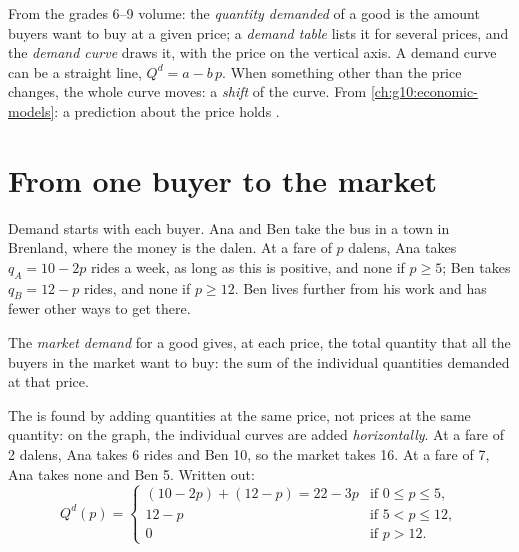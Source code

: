 \begin{recall}
From the grades 6--9 volume: the \emph{quantity demanded} of a good is the amount buyers want to buy at a given
price; a \emph{demand table} lists it for several prices, and the \emph{demand curve} draws it, with the price on
the vertical axis. A demand curve can be a straight line, $Q^d = a - b\,p$. When something other than the price
changes, the whole curve moves: a \emph{shift} of the curve. From \cref{ch:g10:economic-models}: a prediction
about the price holds \emph{}.
\end{recall}

\section{From one buyer to the market}\label{sec:g10:demand:market}

Demand starts with each buyer. Ana and Ben take the bus in a town in Brenland, where the money is the dalen.
At a fare of $p$ dalens, Ana takes $q_A = 10 - 2p$ rides a week, as long as this is positive, and none if $p \ge 5$;
Ben takes $q_B = 12 - p$ rides, and none if $p \ge 12$. Ben lives further from his work and has fewer other ways to
get there.

\begin{definition}\label{def:g10:demand:market-demand}
The \emph{market demand} for a good gives, at each price, the total quantity that all the buyers
in the market want to buy: the sum of the individual quantities demanded at that price.
\end{definition}

The  is found by adding quantities at the same price, not prices at the same quantity: on the graph,
the individual curves are added \emph{horizontally}. At a fare of 2 dalens, Ana takes 6 rides and Ben 10, so the market
takes 16. At a fare of 7, Ana takes none and Ben 5. Written out:
\[
  Q^d(p) = \begin{cases} (10 - 2p) + (12 - p) = 22 - 3p & \text{if } 0 \le p \le 5, \\
  12 - p & \text{if } 5 < p \le 12, \\ 0 & \text{if } p > 12. \end{cases}
\]

